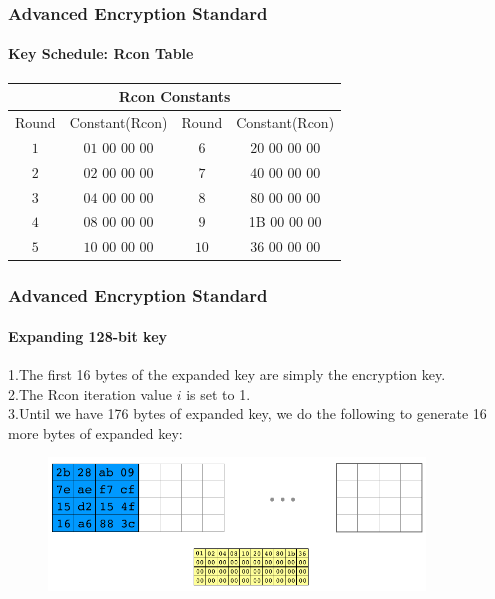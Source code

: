\begin{frame}
	\frametitle{Advanced Encryption Standard}
		\framesubtitle{Key Schedule: Rcon Table}
		\begin{table}
			\begin{center}
				\setlength\arrayrulewidth{1pt}
				
				\begin{tabular}{|c|c|c|c|}
					\hline 
					\multicolumn{4}{|c|}{Rcon Constants}\\
					\hline
					\hline Round 	& Constant(Rcon)		 &Round  		& Constant(Rcon)		\\
					\hline $1$	 	& $01$ $00$ $00$ $00$    &$6$			&$20$ $00$ $00$ $00$  	\\
					\hline $2$	 	& $02$ $00$ $00$ $00$    &$7$			&$40$ $00$ $00$ $00$  	\\
					\hline $3$	 	& $04$ $00$ $00$ $00$    &$8$			&$80$ $00$ $00$ $00$  	\\
					\hline $4$	 	& $08$ $00$ $00$ $00$    &$9$			&1B $00$ $00$ $00$  	\\
					\hline $5$	 	& $10$ $00$ $00$ $00$    &$10$			&$36$ $00$ $00$ $00$  	\\
					\hline
				\end{tabular}
			\end{center}
		\end{table}

		\vfill
\end{frame}

\begin{frame}

	\frametitle{Advanced Encryption Standard}
	\framesubtitle{Expanding 128-bit key}
	{\normalsize
    {1.The first 16 bytes of the expanded key are simply the encryption key.}\\
    {2.The Rcon iteration value $i$ is set to 1.}\\
    {3.Until we have 176 bytes of expanded key, we do the following to generate 16 more bytes of expanded key:}\\
	}
	\begin{figure}
		\vfill
		\centering
		\includegraphics[width=10cm]{keysch1}
		\label{fig:obrazek keysch1}
	\end{figure}
\end{frame}


